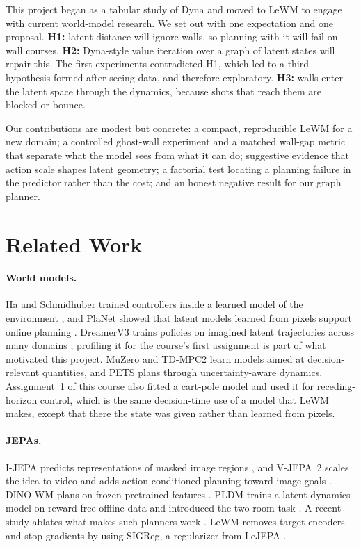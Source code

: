 \documentclass[10pt,twocolumn]{article}
\begin{document}
This project began as a tabular study of Dyna \cite{sutton1990dyna} and moved to LeWM to engage with current world-model research. We set out with one expectation and one proposal. \textbf{H1:} latent distance will ignore walls, so planning with it will fail on wall courses. \textbf{H2:} Dyna-style value iteration over a graph of latent states will repair this. The first experiments contradicted H1, which led to a third hypothesis formed after seeing data, and therefore exploratory. \textbf{H3:} walls enter the latent space through the dynamics, because shots that reach them are blocked or bounce.

Our contributions are modest but concrete: a compact, reproducible LeWM for a new domain; a controlled ghost-wall experiment and a matched wall-gap metric that separate what the model sees from what it can do; suggestive evidence that action scale shapes latent geometry; a factorial test locating a planning failure in the predictor rather than the cost; and an honest negative result for our graph planner.

\section{Related Work}
\paragraph{World models.} Ha and Schmidhuber trained controllers inside a learned model of the environment \cite{ha2018worldmodels}, and PlaNet showed that latent models learned from pixels support online planning \cite{hafner2019planet}. DreamerV3 trains policies on imagined latent trajectories across many domains \cite{hafner2025dreamerv3}; profiling it for the course's first assignment is part of what motivated this project. MuZero \cite{schrittwieser2020muzero} and TD-MPC2 \cite{hansen2024tdmpc2} learn models aimed at decision-relevant quantities, and PETS \cite{chua2018pets} plans through uncertainty-aware dynamics. Assignment~1 of this course also fitted a cart-pole model and used it for receding-horizon control, which is the same decision-time use of a model that LeWM makes, except that there the state was given rather than learned from pixels.

\paragraph{JEPAs.} I-JEPA predicts representations of masked image regions \cite{assran2023ijepa}, and V-JEPA~2 scales the idea to video and adds action-conditioned planning toward image goals \cite{assran2025vjepa2}. DINO-WM plans on frozen pretrained features \cite{zhou2025dinowm}. PLDM trains a latent dynamics model on reward-free offline data and introduced the two-room task \cite{sobal2025pldm}. A recent study ablates what makes such planners work \cite{terver2026jepawms}. LeWM \cite{maes2026lewm} removes target encoders and stop-gradients by using SIGReg, a regularizer from LeJEPA \cite{balestriero2025lejepa}.
\end{document}
